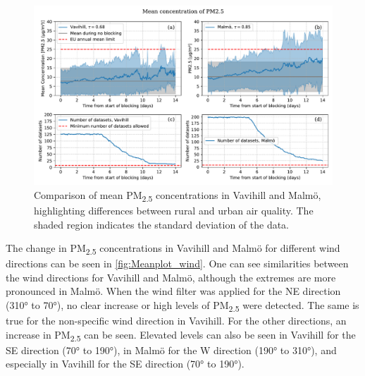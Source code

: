 \begin{figure}[H]
    \centering
    \includegraphics[width=\textwidth]{Figures/Meanplot.pdf}
    \caption{Comparison of mean PM\textsubscript{2.5} concentrations in Vavihill and Malmö, highlighting differences between rural and urban air quality. The shaded region indicates the standard deviation of the data.}
    \label{fig:Meanplot_Comparison}
\end{figure}

The change in PM\textsubscript{2.5} concentrations in Vavihill and Malmö for different wind directions can be seen in \autoref{fig:Meanplot_wind}. One can see similarities between the wind directions for Vavihill and Malmö, although the extremes are more pronounced in Malmö. When the wind filter was applied for the NE direction (310° to 70°), no clear increase or high levels of PM\textsubscript{2.5} were detected. The same is true for the non-specific wind direction in Vavihill. For the other directions, an increase in PM\textsubscript{2.5} can be seen. Elevated levels can also be seen in Vavihill for the SE direction (70° to 190°), in Malmö for the W direction (190° to 310°), and especially in Vavihill for the SE direction (70° to 190°).


